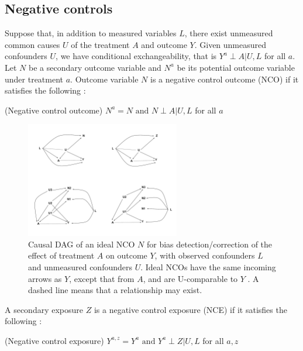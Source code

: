\subsection{Negative controls}

Suppose that, in addition to measured variables $L$, there exist unmeasured common causes $U$ of the treatment $A$ and outcome $Y$. Given unmeasured confounders $U$, we have conditional exchangeability, that is $Y^a \perp A | U, L$ for all $a$. Let $N$ be a secondary outcome variable and $N^a$ be its potential outcome variable under treatment $a$. Outcome variable $N$ is a negative control outcome (NCO) if it satisfies the following \cite{shi2020selective}:

\begin{assumption} (Negative control outcome) \label{as:nco}
  $N^a = N \text{ and } N \perp A | U, L$ for all $a$
\end{assumption}

\begin{figure}[H]
    \centering
    \includegraphics[trim={0 11cm 13cm 1.5cm}, clip, width=0.6\textwidth]{figures/dags.pdf}
    \caption[Causal DAG of an ideal NCO $N$ for bias detection/correction of the effect of treatment $A$ on outcome $Y$.]{Causal DAG of an ideal NCO $N$ for bias detection/correction of the effect of treatment $A$ on outcome $Y$, with observed confounders $L$ and unmeasured confounders $U$. Ideal NCOs have the same incoming arrows as $Y$, except that from $A$, and are U-comparable to $Y$ \cite{lipsitch2010negative}. A dashed line means that a relationship may exist.}
    \label{fig:nco-nco-dag}
\end{figure}

A secondary exposure $Z$ is a negative control exposure (NCE) if it satisfies the following \cite{shi2020selective}:

\begin{assumption} (Negative control exposure) \label{as:nce}
  $Y^{a,z} = Y^a \text{ and } Y^a \perp Z | U, L$ for all $a, z$
\end{assumption}

